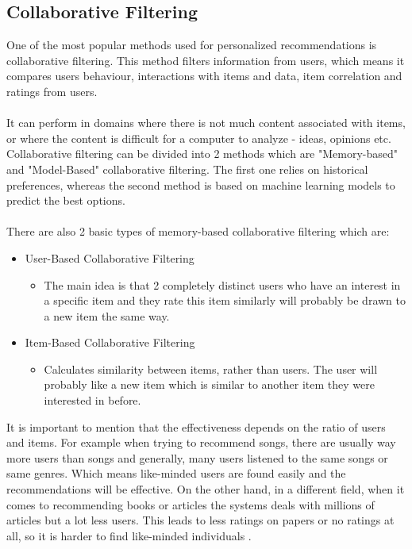 \documentclass[10pt,oneside,english,a4paper]{article}
\begin{document}
\subsection{Collaborative Filtering}
One of the most popular methods used for personalized recommendations is collaborative filtering. This method filters information from users, which means it compares users behaviour, interactions with items and data, item correlation and ratings from users. \\\\
It can perform in domains where there is not much content associated with items, or
where the content is difficult for a computer to analyze - ideas, opinions etc.\cite{melville:aaai02}\\
Collaborative filtering can be divided into 2 methods which are "Memory-based" and "Model-Based" collaborative filtering. The first one relies on historical preferences, whereas the second method is based on machine learning models to predict the best options.\\\\
There are also 2 basic types of memory-based collaborative filtering which are:
\begin{itemize}
\item User-Based Collaborative Filtering
	\begin{itemize}
	\item The main idea is that 2 completely distinct users who have an interest in a specific item and they rate this item similarly will probably be drawn to a new item the same way.
	\end{itemize}
\item Item-Based Collaborative Filtering
	\begin{itemize}
	\item Calculates similarity between items, rather than users. The user will probably like a new item which is similar to another item they were interested in before.\\
	\end{itemize}
\end{itemize}
It is important to mention that the effectiveness depends on the ratio of users and items. For example when trying to recommend songs, there are usually way more users than songs and generally, many users listened to the same songs or same genres. Which means like-minded users are found easily and the recommendations will be effective. On the other hand, in a different field, when it comes to recommending books or articles the systems deals with millions of articles but a lot less users. This leads to less ratings on papers or no ratings at all, so it is harder to find like-minded individuals \cite{Beel2016305}.\\
\end{document}

